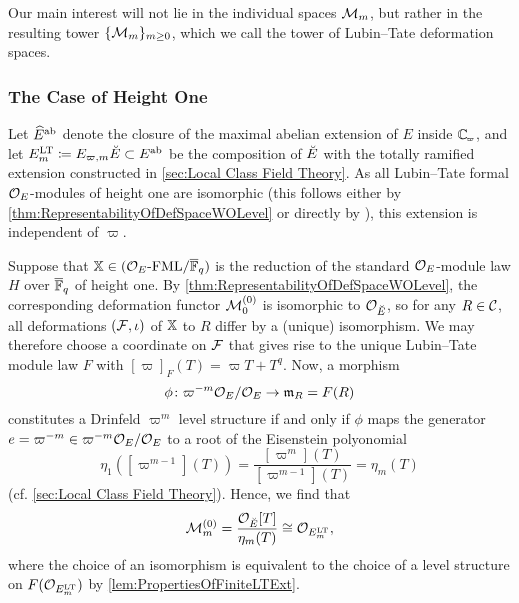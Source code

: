 \documentclass[../main.tex]{subfiles}
\begin{document}
Our main interest will not lie in the individual spaces $\mathcal{M}_m$, but rather in
the resulting tower $\{\mathcal{M}_m\}_{m \geq 0}$, which we call the tower of
Lubin--Tate deformation spaces.


\subsubsection{The Case of Height One} %
\label{ssub:The Case of Height One}
Let $\widehat E^{\mathrm{ab}}$ denote the closure of the maximal abelian extension of $E$ inside
$\Cp$, and let $E_m^{\mathrm{LT}} \coloneq E_{\varpi, m}{\breve {E}} \subset E^{\mathrm{ab}}$ be the composition
of ${\breve {E}}$ with the totally ramified extension constructed in \cref{sec:Local
Class Field Theory}. As all Lubin--Tate formal $\mathcal{O}_E$-modules of height one
are isomorphic (this follows either by \cref{thm:RepresentabilityOfDefSpaceWOLevel} 
or directly by \cite[Lemma 2]{LubinTateFormalMult}), this extension is independent
of $\varpi$. 

Suppose that $\mathbb{X} \in {({\mathcal{O}_E}\textnormal-\allowbreak\mathrm{FML}/{{\overline{\mathbb{F}}_q}})}$ is the reduction of the standard
$\mathcal{O}_E$-module law $H$ over ${\overline {\mathbb{F}}_q}$ of height one. 
By \cref{thm:RepresentabilityOfDefSpaceWOLevel}, the corresponding deformation functor
$\mathcal{M}_0^{(0)}$ is isomorphic to $\mathcal{O}_{\breve {E}}$, so for any $R \in \mathcal{C}$, all deformations
$(\mathcal{F}, \iota)$ of $\mathbb{X}$ to $R$ differ by a (unique) isomorphism. We may therefore
choose a coordinate on
$\mathcal{F}$ that gives rise to the unique Lubin--Tate module law $F$ with
$[\varpi]_F(T) = \varpi T + T^q$. Now, a morphism 
\begin{equation*}
  \phi \colon \varpi^{-m}\mathcal{O}_E / \mathcal{O}_E \to \mathfrak{m}_R = F(R)
\end{equation*}
constitutes a Drinfeld $\varpi^m$ level structure if and only if 
$\phi$ maps the generator $e = \varpi^{-m} \in \varpi^{-m} \mathcal{O}_E/\mathcal{O}_E$ 
to a root of the Eisenstein polyonomial 
\begin{equation*}
  \eta_1([\varpi^{m-1}](T)) = \frac{[\varpi^m](T)}{[\varpi^{m-1}](T)} = \eta_m(T)
\end{equation*}
(cf. \cref{sec:Local Class Field Theory}). 
Hence, we find that 
\begin{equation}\label{eq:HeightOneDefSpaceIsOEm}
  \mathcal{M}_{m}^{(0)} = \frac{\mathcal{O}_{\breve {E}}[T]}{\eta_m(T)} \cong \mathcal{O}_{E_m^{\mathrm{LT}}},
\end{equation}
where the choice of an isomorphism is equivalent to the choice of a level structure 
on $F(\mathcal{O}_{E_m^{\mathrm{LT}}})$ by \cref{lem:PropertiesOfFiniteLTExt}. 
\end{document}
